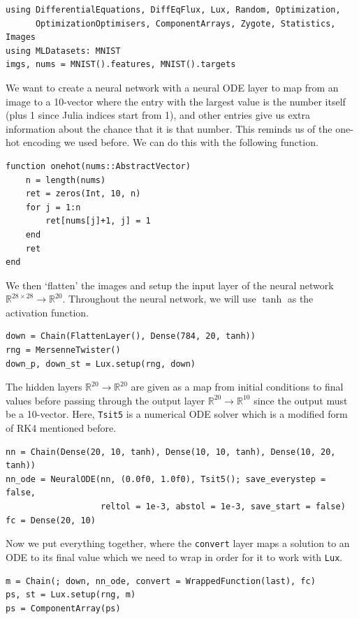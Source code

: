 \documentclass[a4paper,11pt,titlepage]{article}
\theoremstyle{definition}
\theoremstyle{plain}
\theoremstyle{remark}
\begin{document}
\begin{verbatim}
using DifferentialEquations, DiffEqFlux, Lux, Random, Optimization,
      OptimizationOptimisers, ComponentArrays, Zygote, Statistics, Images
using MLDatasets: MNIST
imgs, nums = MNIST().features, MNIST().targets
\end{verbatim}

We want to create a neural network with a neural ODE layer to map from an image to a 10-vector where the entry with the largest value is the number itself (plus 1 since Julia indices start from 1), and other entries give us extra information about the chance that it is that number. This reminds us of the one-hot encoding we used before. We can do this with the following function.

\begin{verbatim}
function onehot(nums::AbstractVector)
    n = length(nums)
    ret = zeros(Int, 10, n)
    for j = 1:n
        ret[nums[j]+1, j] = 1
    end
    ret
end
\end{verbatim}

We then ‘flatten’ the images and setup the input layer of the neural network $\mathbb{R}^{28\times28}\rightarrow\mathbb{R}^{20}$. Throughout the neural network, we will use $\tanh$ as the activation function.

\begin{verbatim}
down = Chain(FlattenLayer(), Dense(784, 20, tanh))
rng = MersenneTwister()
down_p, down_st = Lux.setup(rng, down)
\end{verbatim}

The hidden layers $\mathbb{R}^{20}\rightarrow\mathbb{R}^{20}$ are given as a map from initial conditions to final values before passing through the output layer $\mathbb{R}^{20}\rightarrow\mathbb{R}^{10}$ since the output must be a 10-vector. Here, \verb|Tsit5| is a numerical ODE solver which is a modified form of RK4 mentioned before.

\begin{verbatim}
nn = Chain(Dense(20, 10, tanh), Dense(10, 10, tanh), Dense(10, 20, tanh))
nn_ode = NeuralODE(nn, (0.0f0, 1.0f0), Tsit5(); save_everystep = false,
                   reltol = 1e-3, abstol = 1e-3, save_start = false)
fc = Dense(20, 10)
\end{verbatim}

Now we put everything together, where the \verb|convert| layer maps a solution to an ODE to its final value which we need to wrap in order for it to work with \verb|Lux|.

\begin{verbatim}
m = Chain(; down, nn_ode, convert = WrappedFunction(last), fc)
ps, st = Lux.setup(rng, m)
ps = ComponentArray(ps)
\end{verbatim}
\end{document}
